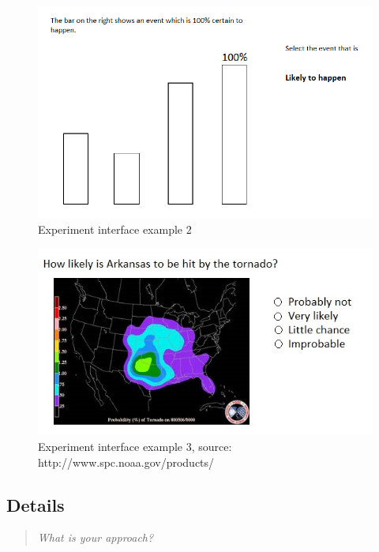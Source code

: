 \documentclass{proc}
\begin{document}
\begin{figure}[!t]
    \centering
    \includegraphics[width=\columnwidth]{figures/exp-int2.png}
    \caption{Experiment interface example 2}
    \label{exp-interface2}
\end{figure}

\begin{figure}[!t]
    \centering
    \includegraphics[width=\columnwidth]{figures/weather-uncertainty2.jpg}
    \caption{Experiment interface example 3, source: http://www.spc.noaa.gov/products/}
    \label{weather-unc2}
\end{figure}

\subsection{Details}
\begin{quote}
\textit{What is your approach?}
\end{quote}
\end{document}
